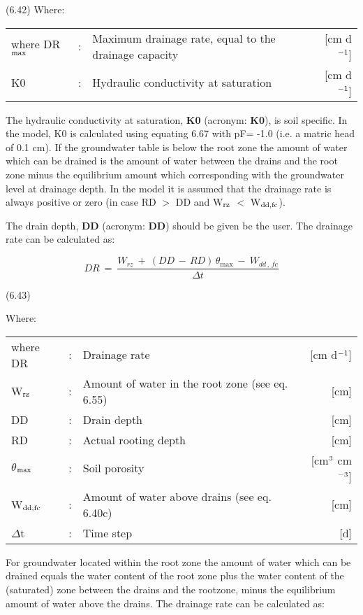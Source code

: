  
\strut\hfill (6.42)
Where:\\
\begin{tabularx}{\textwidth}{llXr}



where DR$_{{\rm max}}$ &:& Maximum drainage rate, equal to the drainage capacity  & [cm d$^{{\rm -1}}$]\\
K0 &:& Hydraulic conductivity at saturation   & [cm d$^{{\rm -1}}$]
\end{tabularx}


The hydraulic conductivity at saturation, {\bf K0}  (acronym: {\bf K0}), is soil specific. In the
model, K0 is calculated using equating 6.67 with pF= -1.0 (i.e. a matric head of 0.1
cm). If the groundwater table is below the root zone the amount of water which can be
drained is the amount of water between the drains and the root zone minus the equilibri\-um amount which corresponding with the groundwater level at drainage depth. In the
model it is assumed that the drainage rate is always positive or zero (in case RD $>$ DD
and W$_{{\rm rz}}$ $<$ W$_{{\rm dd,fc}}$).




The drain depth, {\bf DD} (acronym: {\bf DD}) should be given be the user. The drainage rate can
be calculated as:

\begin{equation}
DR ~=~{\frac{W _{rz} ~+~ (DD\, -\, RD)\, \theta _{\max } ~-~ W _{dd\, ,\, fc} }{\Delta t}}
\end{equation}

 
\strut\hfill (6.43)

Where:\\
\begin{tabularx}{\textwidth}{llXr}



where DR &:& Drainage rate  & [cm d$^{{\rm -1}}$]\\
W$_{{\rm rz}}$ &:& Amount of water in the root zone (see eq. 6.55)  & [cm]\\
DD &:& Drain depth  & [cm]\\
RD &:& Actual rooting depth  & [cm]\\
$\theta$$_{{\rm max}}$ &:& Soil porosity  & [cm$^{{\rm 3}}$ cm$^{{\rm -3}}$]\\
W$_{{\rm dd,fc}}$ &:& Amount of water above drains (see eq. 6.40c)  & [cm]\\
$\Delta$t &:& Time step  & [d]
\end{tabularx}


For groundwater located within the root zone the amount of water which can be drained
equals the water content of the root zone plus the water content of the (saturated) zone
between the drains and the rootzone, minus the equilibrium amount of water above the
drains. The drainage rate can be calculated as:

